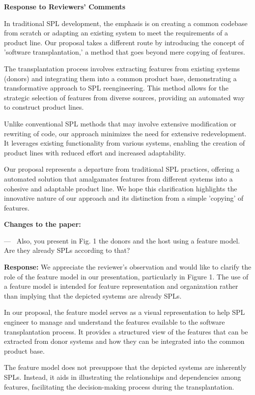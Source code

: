 \documentclass[a4paper,11pt]{letter}
\newcounter{reviewer}
\newcounter{point}[reviewer]
\renewcommand{\thepoint}{P\,\thereviewer.\arabic{point}}
\newenvironment{point}
   {\refstepcounter{point} \bigskip \noindent {\textbf{Reviewer~Point~\thepoint} } ---\ }
   {\par }
\newcommand{\response}[1]{\textbf{Response:} \begingroup\color{black}#1\endgroup}
\newcommand{\changes}[1]{\textbf{Changes to the paper:} \begingroup\color{blue}#1\endgroup}
\begin{document}
\begin{letter}{\textbf{Response to Reviewers' Comments}}
{In traditional SPL development, the emphasis is on creating a common codebase from scratch or adapting an existing system to meet the requirements of a product line. Our proposal takes a different route by introducing the concept of 'software transplantation,' a method that goes beyond mere copying of features.

The transplantation process involves extracting features from existing systems (donors) and integrating them into a common product base, demonstrating a transformative approach to SPL reengineering. This method allows for the strategic selection of features from diverse sources, providing an automated way to construct product lines.

Unlike conventional SPL methods that may involve extensive modification or rewriting of code, our approach minimizes the need for extensive redevelopment. It leverages existing functionality from various systems, enabling the creation of product lines with reduced effort and increased adaptability.

Our proposal represents a departure from traditional SPL practices, offering a automated solution that amalgamates features from different systems into a cohesive and adaptable product line. We hope this clarification highlights the innovative nature of our approach and its distinction from a simple 'copying' of features.}

\changes{}

\begin{point} 
Also, you present in Fig. 1 the donors and the  host using a feature model. Are they already SPLs according to that? 
\end{point}

\response{We appreciate the reviewer's observation and would like to clarify the role of the feature model in our presentation, particularly in Figure 1. The use of a feature model is intended for feature representation and organization rather than implying that the depicted systems are already SPLs.

In our proposal, the feature model serves as a visual representation to help SPL engineer to manage and understand the features evailable to the software transplantation process. It provides a structured view of the features that can be extracted from donor systems and how they can be integrated into the common product base.

The feature model does not presuppose that the depicted systems are inherently SPLs. Instead, it aids in illustrating the relationships and dependencies among features, facilitating the decision-making process during the transplantation.

}
\end{letter}
\end{document}
